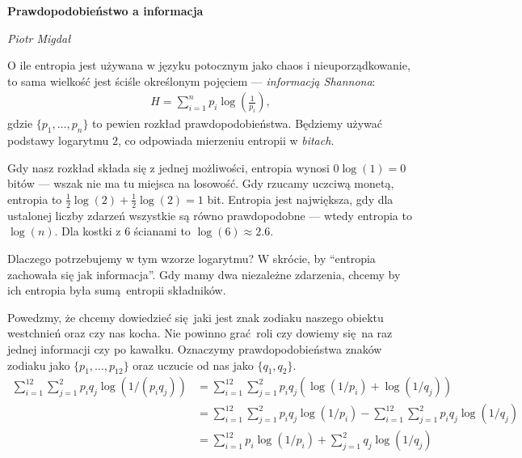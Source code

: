 \documentclass[10pt,a4paper]{article}
\begin{document}
\noindent\textbf{\LARGE Prawdopodobieństwo a informacja}

\medskip
\noindent\textit{\Large Piotr Migdał} 

\medskip

O ile entropia jest używana w języku potocznym jako chaos i nieuporządkowanie, to sama wielkość jest ściśle określonym pojęciem --- \emph{informacją Shannona}:
%
%
\begin{align}
    H = \sum_{i=1}^{n} p_i \log \left(\tfrac{1}{p_i} \right),
\end{align}
%
%
gdzie $\{p_1, \ldots, p_n\}$ to pewien rozkład prawdopodobieństwa. Będziemy używać podstawy logarytmu $2$, co odpowiada mierzeniu entropii w \emph{bitach}. 

Gdy nasz rozkład składa się z jednej możliwości, entropia wynosi $0 \log(1) = 0$ bitów --- wszak nie ma tu miejsca na losowość.
Gdy rzucamy uczciwą monetą, entropia to $\tfrac{1}{2} \log(2) + \tfrac{1}{2} \log(2) = 1$ bit.
Entropia jest największa, gdy dla ustalonej liczby zdarzeń wszystkie są równo prawdopodobne --- wtedy entropia to $\log(n)$.
Dla kostki z $6$ ścianami to $\log(6)\approx 2.6$. 


Dlaczego potrzebujemy w tym wzorze logarytmu? 
W skrócie, by ``entropia zachowała się jak informacja''. Gdy mamy dwa niezależne zdarzenia, chcemy by ich entropia była sumą entropii składników.

%
Powedzmy, że chcemy dowiedzieć się jaki jest znak zodiaku naszego obiektu westchnień oraz czy nas kocha. Nie powinno grać roli czy dowiemy się na raz jednej informacji czy po kawałku.
Oznaczymy prawdopodobieństwa znaków zodiaku jako $\{p_1, \ldots, p_12 \}$ oraz uczucie od nas jako $\{q_1, q_2\}$.
%
\begin{align}
    \sum_{i=1}^{12} \sum_{j=1}^2 p_i q_j \log(1/(p_i q_j))
    &= \sum_{i=1}^{12} \sum_{j=1}^2 p_i q_j \left( \log(1/p_i) + \log(1/q_j) \right)\\
    &= \sum_{i=1}^{12} \sum_{j=1}^2 p_i q_j \log(1/p_i)
    -\sum_{i=1}^{12} \sum_{j=1}^2 p_i q_j \log(1/q_j)\\
    &= \sum_{i=1}^{12} p_i \log(1/p_i)
    + \sum_{j=1}^2 q_j \log(1/q_j)
\end{align}
\end{document}
